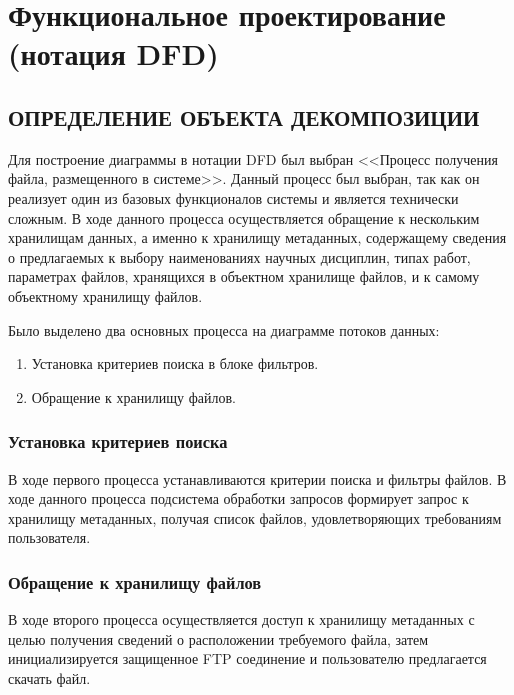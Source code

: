 \documentclass[a4paper,14pt]{extarticle}
\begin{document}
\newpage
\section{Функциональное проектирование (нотация DFD)}

\subsection{ОПРЕДЕЛЕНИЕ ОБЪЕКТА ДЕКОМПОЗИЦИИ}
Для построение диаграммы в нотации DFD был выбран <<Процесс получения файла, размещенного в системе>>. Данный процесс был выбран, так как он реализует один из базовых функционалов системы и является технически сложным. В ходе данного процесса осуществляется обращение к нескольким хранилищам данных, а именно к хранилищу метаданных, содержащему сведения о предлагаемых к выбору наименованиях научных дисциплин, типах работ, параметрах файлов, хранящихся в объектном хранилище файлов, и к самому объектному хранилищу файлов.


Было выделено два основных процесса на диаграмме потоков данных:
\begin{enumerate}
	\item Установка критериев
	поиска в блоке фильтров.
	\item Обращение
	к хранилищу файлов.
\end{enumerate}
\subsubsection{Установка критериев поиска}
В ходе первого процесса устанавливаются критерии поиска и фильтры файлов. В ходе данного процесса подсистема обработки запросов формирует запрос к хранилищу метаданных, получая список файлов, удовлетворяющих требованиям пользователя. 
\subsubsection{Обращение к хранилищу файлов}
В ходе второго процесса осуществляется доступ к хранилищу метаданных с целью получения сведений о расположении требуемого файла, затем инициализируется защищенное FTP соединение и пользователю предлагается скачать файл. 
\end{document}
